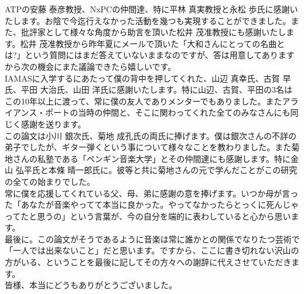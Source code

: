 \documentclass[uplatex,dvipdfmx]{ujarticle}
\begin{document}
ATPの安藤 泰彦教授、NxPCの仲間達、特に平林 真実教授と永松 歩氏に感謝いたします。お陰で今迄行えなかった活動を幾つも実現することができました。また、批評家として様々な角度から助言を頂いた松井 茂准教授にも感謝いたします。松井 茂准教授から昨年夏にメールで頂いた「大和さんにとっての名曲とは?」という質問にはまだ答えていないままなのですが、答は用意してありますから次の機会にまた議論できたら嬉しいです。\\

IAMASに入学するにあたって僕の背中を押してくれた、山辺 真幸氏、古賀 早氏、平田 大治氏、山田 洋氏に感謝いたします。特に山辺、古賀、平田の3名はこの10年以上に渡って、常に僕の友人でありメンターでもありました。またアライアンス・ポートの当時の仲間と、そこに関わってくれた全てのみなさんにも同じく感謝を送ります。\\

この論文は小川 銀次氏、菊地 成孔氏の両氏に捧げます。僕は銀次さんの不詳の弟子でしたが、ギター弾くという事について様々なことを教わりました。また菊地さんの私塾である「ペンギン音楽大学」とその仲間達にも感謝します。特に金山 弘平氏と本條 晴一郎氏に。彼等と共に菊地さんの元で学んだことがこの研究の全ての始まりでした。\\

常に僕を応援してくれている父、母、弟に感謝の意を捧げます。いつか母が言った「あなたが音楽やってて本当に良かった。やってなかったらとっくに死んじゃってたと思うの」という言葉が、今の自分を端的に表わしていると心から思います。\\

最後に。この論文がそうであるように音楽は常に誰かとの関係でなりたつ芸術で「一人では出来ないこと」だと思います。ですから、ここに書き切れない沢山の方がいる、ということを最後に記してその方々への謝辞に代えさせていただきます。\\

皆様、本当にどうもありがとうございました。
\end{document}
